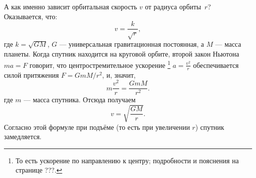 А как именно зависит орбитальная скорость \(v\) от радиуса орбиты~\(r\)?
Оказывается, что:
\[
v = \frac{k}{\sqrt{r}},
\]
где \(k = \sqrt{GM}\),
\(G\) — универсальная гравитационная постоянная,
а \(M\) — масса планеты.
Когда спутник находится на круговой орбите, второй закон Ньютона \(ma = F\) говорит, что центростремительное ускорение%
\footnote{То есть ускорение по направлению к центру; подробности и пояснения на странице ???.}
$a = \frac{v^2}{r}$ обеспечивается силой притяжения $F = {GmM}/{r^2}$, и, значит,
\[
m \frac{v^2}{r} = \frac{GmM}{r^2}.
\]
где \(m\) — масса спутника.
Отсюда получаем
\[
v = \sqrt{\frac{GM}{r}}.
\]
Согласно этой формуле при подъёме (то есть при увеличении \(r\)) спутник замедляется.
